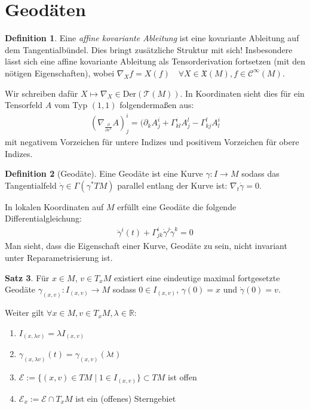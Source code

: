 \documentclass[a4paper]{scrreprt}
\numberwithin{equation}{chapter}
\newcommand{\R}{\mathbb{R}}
\newcommand{\sC}{\mathcal{C}^{\infty}}
\newcommand{\vf}{\mathfrak{X}}
\theoremstyle{definition}
\newtheorem{defn}{Definition}[section]
\newtheorem{satz}[defn]{Satz}
\begin{document}
	\section{Geodäten}
		\begin{defn}
			Eine \emph{affine kovariante Ableitung} ist eine kovariante Ableitung auf dem Tangentialbündel. Dies bringt zusätzliche Struktur mit sich! Insbesondere lässt sich eine affine kovariante Ableitung als Tensorderivation fortsetzen (mit den nötigen Eigenschaften), wobei $\nabla_Xf=X(f) \quad\forall X\in\vf(M),f\in\sC(M)$.
			
			Wir schreiben dafür $X\mapsto\nabla_X\in \mathrm{Der}(\mathcal{T}(M))$. In Koordinaten sieht dies für ein Tensorfeld $A$ vom Typ $(1,1)$ folgendermaßen aus:
			\begin{align*}
				(\nabla_{\frac{\partial}{\partial x^k}} A)^i_j=(\partial_k A^i_j+\Gamma^i_{kl}A^l_j-\Gamma^l_{kj}A^i_l
			\end{align*}
			mit negativem Vorzeichen für untere Indizes und positivem Vorzeichen für obere Indizes.
		\end{defn}
		\begin{defn}[Geodäte]
			Eine Geodäte ist eine Kurve $\gamma\colon I\rightarrow M$ sodass das Tangentialfeld $\dot{\gamma}\in\Gamma(\gamma^*TM)$ parallel entlang der Kurve ist: $\nabla_{t}\dot{\gamma}=0$.
			
			In lokalen Koordinaten auf $M$ erfüllt eine Geodäte die folgende Differentialgleichung:
			\begin{align*}
				\ddot{\gamma}^i(t)+\Gamma^i_{jk}\dot{\gamma}^j\dot{\gamma}^k=0
			\end{align*}
			Man sieht, dass die Eigenschaft einer Kurve, Geodäte zu sein, nicht invariant unter Reparametrisierung ist.
		\end{defn}
		\begin{satz}
			Für $x\in M$, $v\in T_xM$ existiert eine eindeutige maximal fortgesetzte Geodäte $\gamma_{(x,v)}\colon I_{(x,v)}\rightarrow M$ sodass $0\in I_{(x,v)}$, $\gamma(0)=x$ und $\dot{\gamma}(0)=v$.
			
			Weiter gilt $\forall x\in M, v\in T_xM,\lambda\in \R$:
			\begin{enumerate}[label=\arabic* .]
				\item $I_{(x,\lambda v)}=\lambda I_{(x,v)}$
				\item $\gamma_{(x,\lambda v)}(t)=\gamma_{(x, v)}(\lambda t)$
				\item $\mathcal{E}:=\lbrace (x,v)\in TM\mid 1\in I_{(x,v)}\rbrace\subset TM$ ist offen
				\item $\mathcal{E}_x:=\mathcal{E}\cap T_xM$ ist ein (offenes) Sterngebiet
			\end{enumerate}		 
		\end{satz}
\end{document}
